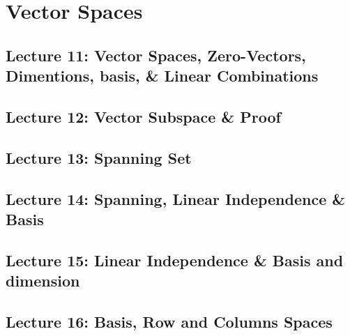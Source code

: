 \documentclass[oneside]{book}
\begin{document}
\chapter{Vector Spaces}
\section{Lecture 11: Vector Spaces, Zero-Vectors, Dimentions, basis, \& Linear Combinations}



\newpage
\section{Lecture 12: Vector Subspace \& Proof}




\newpage
\section{Lecture 13: Spanning Set}




\newpage
\section{Lecture 14: Spanning, Linear Independence \& Basis}

\newpage
\section{Lecture 15: Linear Independence \& Basis and dimension}

\newpage
\section{Lecture 16: Basis, Row and Columns Spaces}
\end{document}
